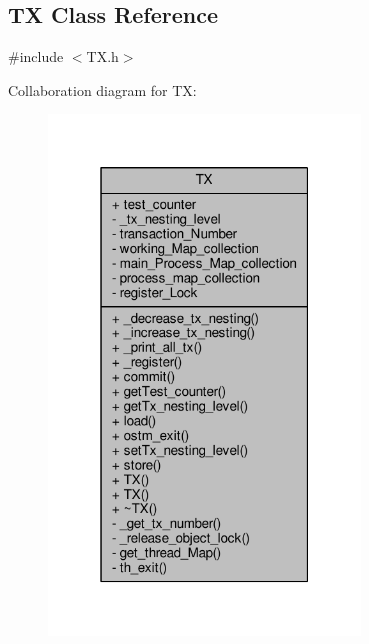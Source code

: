 \hypertarget{class_t_x}{}\subsection{TX Class Reference}
\label{class_t_x}


{\ttfamily \#include $<$T\+X.\+h$>$}



Collaboration diagram for TX\+:
\nopagebreak
\begin{figure}[H]
\begin{center}
\leavevmode
\includegraphics[width=235pt]{class_t_x__coll__graph}
\end{center}
\end{figure}
